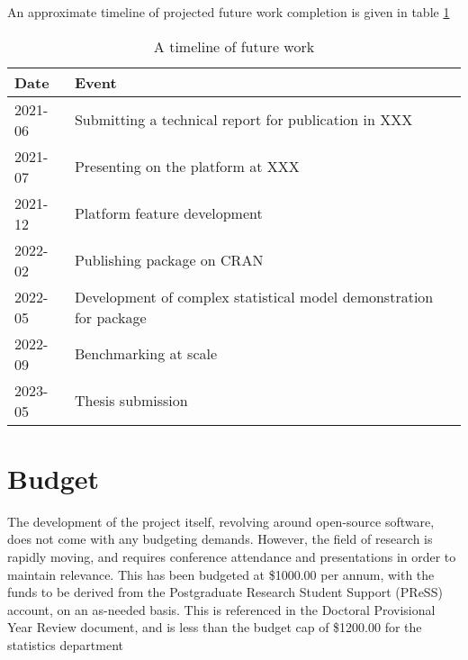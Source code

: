 \documentclass[a4paper,10pt]{article}
\begin{document}
An approximate timeline of projected future work completion is given in table \ref{future-timeline}

\begin{table}[h]
	\centering
	\begin{tabularx}{\textwidth}{lX}
		\toprule
		Date & Event\\
		\midrule
		2021-06 & Submitting a technical report for publication in XXX\\
		2021-07 & Presenting on the platform at XXX\\
		2021-12 & Platform feature development\\
		2022-02 & Publishing package on CRAN\\
		2022-05 & Development of complex statistical model demonstration for package\\
		2022-09 & Benchmarking at scale\\
		2023-05 & Thesis submission\\
		\bottomrule
	\end{tabularx}
	\caption{\label{future-timeline}A timeline of future work}
\end{table}

\section{Budget}

The development of the project itself, revolving around open-source software, does not come with any budgeting demands.
However, the field of research is rapidly moving, and requires conference attendance and presentations in order to maintain relevance.
This has been budgeted at \$1000.00 per annum, with the funds to be derived from the Postgraduate Research Student Support (PReSS) account, on an as-needed basis.
This is referenced in the Doctoral Provisional Year Review document, and is less than the budget cap of \$1200.00 for the statistics department

\printbibliography
\end{document}
